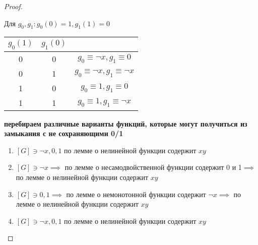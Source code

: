 \documentclass[a4paper]{article}
\theoremstyle{definition}
\theoremstyle{remark}
\begin{document}
\begin{proof}
\begin{itemize}
            Для $g_0, g_1: g_0(0) = 1, g_1(1) = 0$
            \begin{tabular}{c|c|c}
                $g_0(1)$ & $g_1(0)$ & \\
                \hline
                0 & 0 & $g_0 \equiv \neg x, g_1 \equiv 0$\\
                0 & 1 & $g_0 \equiv \neg x, g_1 \equiv \neg x$\\
                1 & 0 & $g_0 \equiv 1, g_1 \equiv 0$\\
                1 & 1 & $g_0 \equiv 1, g_1 \equiv \neg x$\\
            \end{tabular}
            \textbf{перебираем различные варианты функций, которые могут получиться из замыкания с не сохраняющими 0/1}
            \begin{enumerate}
                \item $[G]\ni \neg x, 0, 1$ по лемме о нелинейной функции
                содержит $xy$
                \item $[G]\ni \neg x\implies$ по лемме о несамодвойственной функции содержит 0 и 1$\implies$
                по лемме о нелинейной функции содержит $xy$
                \item $[G]\ni 0, 1\implies$ по лемме о немонотонной функции содержит $\neg x\implies$
                по лемме о нелинейной функции содержит $xy$
                \item $[G]\ni \neg x, 0, 1$ по лемме о нелинейной функции
                содержит $xy$
            \end{enumerate}
        \end{itemize}
    \end{proof}
\end{document}
